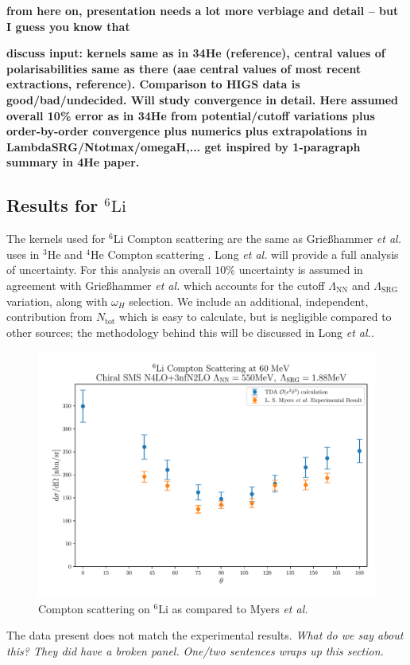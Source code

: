\documentclass[a4paper,11pt]{article}
\newcommand{\Ntot}{N_{\mathrm{tot}}}
\newcommand{\LamSRG}{\Lambda_{\mathrm{SRG}}}
\newcommand{\LamNN}{\Lambda_{\mathrm{NN}}}
\newcommand{\etal}{\textit{et al.}}
\newcommand{\LiS}{{}^{6} \mathrm{Li} }
\newcommand{\HeF}{{}^{4} \mathrm{He}}
\newcommand{\HeT}{{}^{3} \mathrm{He}}
\newcommand{\ques}[1]{\color{red}\textit{ #1 }\color{black}}
\newcommand{\com}[1]{\color{blue}\small\textbf{ #1 }\color{black}\normalsize}
\begin{document}
\com{from here on, presentation needs a lot more verbiage and detail -- but I guess you know that}

\com{discuss input: kernels same as in 34He (reference), central values of polarisabilities same as there (aae central values of most recent extractions, reference). Comparison to HIGS data is good/bad/undecided. Will study convergence in detail. Here assumed overall 10\% error as in 34He from potential/cutoff variations plus order-by-order convergence plus numerics plus extrapolations in LambdaSRG/Ntotmax/omegaH,... get inspired by 1-paragraph summary in 4He paper. }
\subsection{Results for $\LiS$}
The kernels used for $\LiS$ Compton scattering are the same as Grie{\ss}hammer \etal~ uses in $\HeT$ and $\HeF$ Compton scattering \cite{hammer2020, hammer4He}.
Long \etal \cite{upcoming} will provide a full  analysis of uncertainty.
For this analysis an overall $10\%$ uncertainty is assumed in agreement with Grie{\ss}hammer \etal \cite{hammer2020, hammer4He} which accounts for the cutoff $\LamNN$ and $\LamSRG$ variation, 
along with $\omega_H$ selection. 
We include an additional, independent, contribution from $\Ntot$ which is easy to calculate, but is negligible compared to other sources;
the methodology behind this will be discussed in Long \etal \cite{upcoming}.
\begin{figure}[H]
  \centering
  \includegraphics[scale=0.5]{ExpVSTheory-1.pdf}
  \caption{Compton scattering on $\LiS$ as compared to Myers \etal \cite{60MeV}}
  \label{fig:TheoryVSExperiment}
\end{figure}
The data present does not match the experimental results.
\ques{What do we say about this? They did have a broken panel.}
\ques{One/two sentences wraps up this section.}
\end{document}
